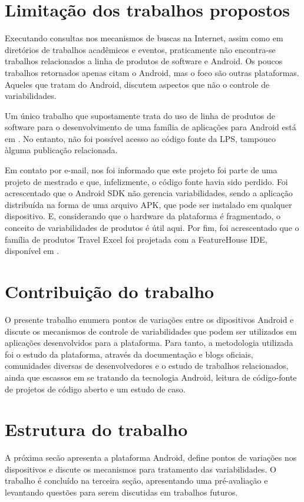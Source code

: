 \section{Limitação dos trabalhos propostos}
Executando consultas nos mecanismos de buscas na Internet, assim como em diretórios 
de trabalhos acadêmicos e eventos, praticamente não encontra-se trabalhos relacionados
a linha de produtos de software e Android. Os poucos trabalhos retornados apenas citam
o Android, mas o foco são outras plataformas. Aqueles que tratam do Android, discutem 
aspectos que não o controle de variabilidades.

Um único trabalho que supostamente trata do uso de linha de produtos de software
para o desenvolvimento de uma família de aplicações para Android está em \cite{gnios}.
No entanto, não foi possível acesso ao código fonte da LPS, tampouco àlguma publicação
relacionada. 

Em contato por e-mail, nos foi informado que este projeto foi parte de uma
projeto de mestrado e que, infelizmente, o código fonte havia sido perdido. Foi 
acrescentado que o Android SDK não gerencia variabilidades, sendo a aplicação distribuída 
na forma de uma arquivo APK, que pode ser instalado em qualquer dispositivo. E, 
considerando que o hardware da plataforma é fragmentado, o conceito de variabilidades
de produtos é útil aqui. Por fim, foi acrescentado que o família de produtos Travel
Excel foi projetada com a FeatureHouse IDE, disponível em \cite{featurehouse}.

\section{Contribuição do trabalho}
O presente trabalho enumera pontos de variações entre os dipositivos Android e 
discute os mecanismos de controle de variabilidades que podem
ser utilizados em aplicações desenvolvidos para a plataforma. Para tanto, 
a metodologia utilizada foi o estudo da plataforma, através da documentação e 
blogs oficiais, comunidades diversas de desenvolvedores e o estudo de trabalhos 
relacionados, ainda que escassos em se tratando da tecnologia Android, leitura de 
código-fonte de projetos de código aberto e um estudo de caso.

\section{Estrutura do trabalho}
A próxima secão apresenta a plataforma Android, define pontos de variações nos 
dispositivos e discute os mecanismos para tratamento das variabilidades. O trabalho 
é concluído na terceira seção, apresentando uma pré-avaliação e levantando questões 
para serem discutidas em trabalhos futuros.

